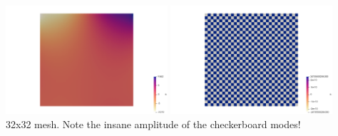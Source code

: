 \begin{center}
\includegraphics[width=6cm]{python_codes/fieldstone_78/results/ldc/32x32/p6}
\includegraphics[width=6cm]{python_codes/fieldstone_78/results/ldc/32x32/p7}\\
{\captionfont 32x32 mesh. Note the insane amplitude of the checkerboard modes!}
\end{center}

